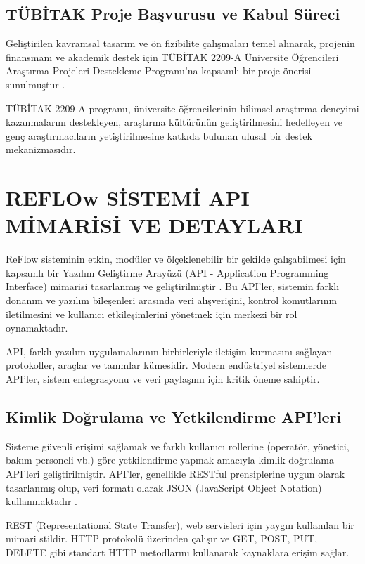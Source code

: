 \documentclass[12pt,a4paper]{article}
\begin{document}
\subsection{TÜBİTAK Proje Başvurusu ve Kabul Süreci}

Geliştirilen kavramsal tasarım ve ön fizibilite çalışmaları temel alınarak, projenin finansmanı ve akademik destek için TÜBİTAK 2209-A Üniversite Öğrencileri Araştırma Projeleri Destekleme Programı'na kapsamlı bir proje önerisi sunulmuştur \cite{tubitak2019research}.

TÜBİTAK 2209-A programı, üniversite öğrencilerinin bilimsel araştırma deneyimi kazanmalarını destekleyen, araştırma kültürünün geliştirilmesini hedefleyen ve genç araştırmacıların yetiştirilmesine katkıda bulunan ulusal bir destek mekanizmasıdır.

\section{REFLOw SİSTEMİ API MİMARİSİ VE DETAYLARI}

ReFlow sisteminin etkin, modüler ve ölçeklenebilir bir şekilde çalışabilmesi için kapsamlı bir Yazılım Geliştirme Arayüzü (API - Application Programming Interface) mimarisi tasarlanmış ve geliştirilmiştir \cite{richardson2021microservices}. Bu API'ler, sistemin farklı donanım ve yazılım bileşenleri arasında veri alışverişini, kontrol komutlarının iletilmesini ve kullanıcı etkileşimlerini yönetmek için merkezi bir rol oynamaktadır.

API, farklı yazılım uygulamalarının birbirleriyle iletişim kurmasını sağlayan protokoller, araçlar ve tanımlar kümesidir. Modern endüstriyel sistemlerde API'ler, sistem entegrasyonu ve veri paylaşımı için kritik öneme sahiptir.

\subsection{Kimlik Doğrulama ve Yetkilendirme API'leri}

Sisteme güvenli erişimi sağlamak ve farklı kullanıcı rollerine (operatör, yönetici, bakım personeli vb.) göre yetkilendirme yapmak amacıyla kimlik doğrulama API'leri geliştirilmiştir. API'ler, genellikle RESTful prensiplerine uygun olarak tasarlanmış olup, veri formatı olarak JSON (JavaScript Object Notation) kullanmaktadır \cite{fielding2000architectural}.

REST (Representational State Transfer), web servisleri için yaygın kullanılan bir mimari stildir. HTTP protokolü üzerinden çalışır ve GET, POST, PUT, DELETE gibi standart HTTP metodlarını kullanarak kaynaklara erişim sağlar.
\end{document}
